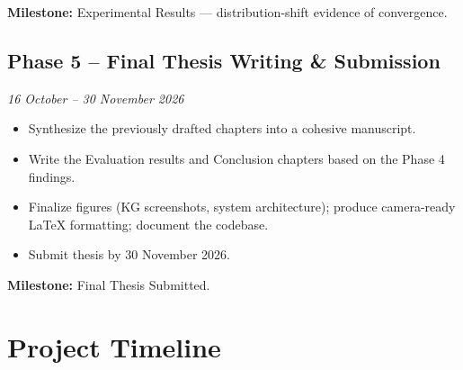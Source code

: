\documentclass[11pt]{article}
\begin{document}
\textbf{Milestone:} Experimental Results --- distribution-shift evidence of convergence.

\subsection*{Phase 5 -- Final Thesis Writing \& Submission}
\textit{16 October -- 30 November 2026}

\begin{itemize}[leftmargin=1.5em, itemsep=2pt]
    \item Synthesize the previously drafted chapters into a cohesive manuscript.
    \item Write the Evaluation results and Conclusion chapters based on the Phase 4 findings.
    \item Finalize figures (KG screenshots, system architecture); produce camera-ready LaTeX formatting; document the codebase.
    \item Submit thesis by 30 November 2026.
\end{itemize}

\textbf{Milestone:} Final Thesis Submitted.

\section*{Project Timeline}
\end{document}

